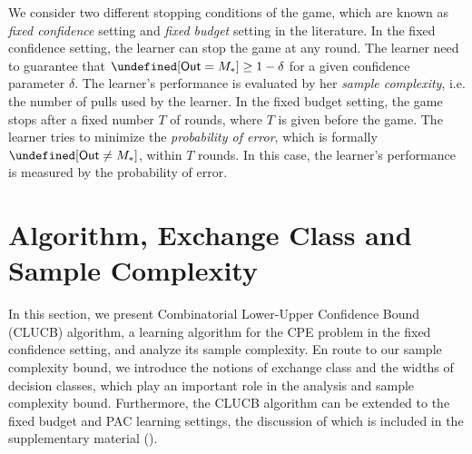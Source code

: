 \documentclass{article}
\newcommand{\Algorithm}{{\small \textsf{CLUCB}}\xspace}
\newcommand{\Problem}{{CPE}\xspace}
\newcommand{\M}{\mathcal M}
\newcommand{\RR}{\mathbb R}
\newcommand{\out}{\mathsf{Out}}
\let\Pr\undefined
\DeclareMathOperator{\Pr}{Pr}
\newcommand{\MultiIdent}{\textsc{TopK}\xspace}
\newcommand{\MultiBandit}{\textsc{MB}\xspace}
\renewcommand{\vec}[1]{\boldsymbol{#1}}
\begin{document}
We consider two different stopping conditions of the game, which are known as \emph{fixed confidence} setting and \emph{fixed budget} setting in the literature.
In the fixed confidence setting, the learner can stop the game at any round. 
The learner need to guarantee that $\Pr[\out = M_*] \ge 1-\delta$ for a given confidence parameter $\delta$.
The learner's performance is evaluated by her \emph{sample complexity}, i.e. the number of pulls used by the learner.
In the fixed budget setting, the game stops after a fixed number $T$ of rounds, where $T$ is given before the game.
The learner tries to minimize the \emph{probability of error}, which is formally $\Pr[\out \not= M_*]$, within $T$ rounds.
In this case, the learner's performance is measured by the probability of error.





\vspace{-0.7em}
\section{Algorithm, Exchange Class and Sample Complexity}
\vspace{-0.7em}


In this section, we present Combinatorial Lower-Upper Confidence Bound (\Algorithm) algorithm, a learning algorithm for the \Problem problem in the fixed confidence setting, and analyze its sample complexity. 
En route to our sample complexity bound, we introduce the notions of exchange class and the widths of decision classes, which play an important role in the analysis and sample complexity bound.
Furthermore, the \Algorithm algorithm can be extended to the fixed budget and PAC learning settings,
	the discussion of which is included in the supplementary material ().
\end{document}
